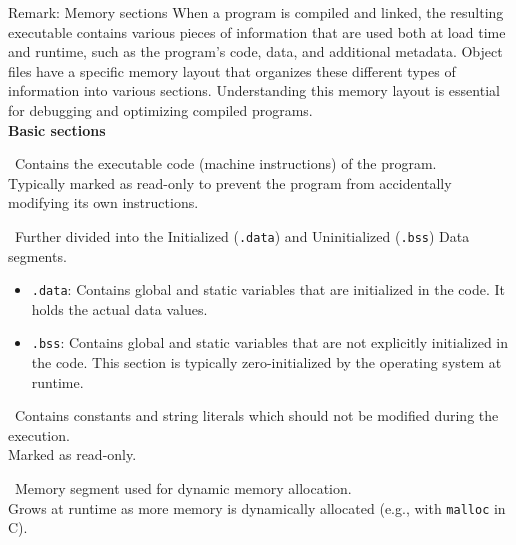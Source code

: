 \documentclass{beamer}
\begin{document}
\begin{frame}[fragile]
\tiny
\begin{block}{Remark: Memory sections}
When a program is compiled and linked, the resulting executable contains various pieces of information that are used both at load time and runtime, such as the program’s code, data, and additional metadata. Object files have a specific memory layout that organizes these different types of information into various sections. Understanding this memory layout is essential for debugging and optimizing compiled programs.\\
\textbf{Basic sections}
\begin{description}[leftmargin=!]
  \item[Text Segment (\texttt{.text}):] \ 
Contains the executable code (machine instructions) of the program. \\
Typically marked as read-only to prevent the program from accidentally modifying its own instructions.

 \item[Data Segment:] \ 
    Further divided into the Initialized (\texttt{.data}) and Uninitialized (\texttt{.bss}) Data segments.
    \begin{itemize}
       \item[] \texttt{.data}: Contains global and static variables that are initialized in the code. It holds the actual data values.
       \item[] \texttt{.bss}: Contains global and static variables that are not explicitly initialized in the code. This section is typically zero-initialized by the operating system at runtime.
    \end{itemize}

 \item[Read-Only Data Segment (\texttt{.rodata}):] \ 
Contains constants and string literals which should not be modified during the execution. \\
Marked as read-only.

\item[Heap:] \ 
    Memory segment used for dynamic memory allocation. \\
    Grows at runtime as more memory is dynamically allocated (e.g., with \texttt{malloc} in C).


\end{description}
\end{block}
\end{frame}
\end{document}
